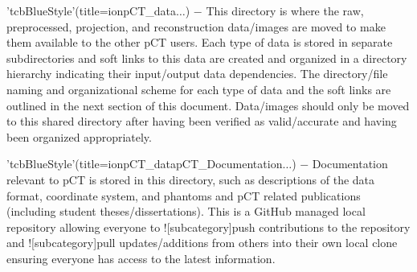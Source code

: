 \begin{tcbenvironment}
\begin{tcbparagraph}
\end{tcbparagraph}
\begin{tcbparagraph}'tcbBlueStyle'(title=\dirsep ion\dirsep pCT\_data\dirsep$\dots$)
$\boldsymbol{-}$ This directory is where the raw, preprocessed, projection, and reconstruction data/images are moved to make them available to the other pCT users.  Each type of data is stored in separate subdirectories and soft links to this data are created and organized in a directory hierarchy indicating their input/output data dependencies.  The directory/file naming and organizational scheme for each type of data and the soft links are outlined in the next section of this document.  Data/images should only be moved to this shared directory after having been verified as valid/accurate and having been organized appropriately.
\end{tcbparagraph}
\begin{tcbparagraph}'tcbBlueStyle'(title=\dirsep ion\dirsep pCT\_data\dirsep pCT\_Documentation\dirsep $\dots$)
$\boldsymbol{-}$ Documentation relevant to pCT is stored in this directory, such as descriptions of the data format, coordinate system, and phantoms and pCT related publications (including student theses/dissertations).  This is a GitHub managed local repository allowing everyone to \docentry![subcategory]{push} contributions to the repository and \docentry![subcategory]{pull} updates/additions from others into their own local clone ensuring everyone has access to the latest information.

\end{tcbparagraph}
\end{tcbenvironment}
